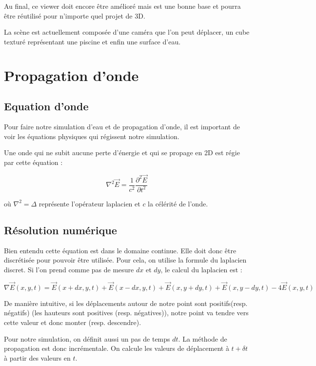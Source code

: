 \documentclass[a4paper,11pt,leqno]{article}
\begin{document}
Au final, ce viewer doit encore être amélioré mais est une bonne base et pourra être réutilisé pour n'importe quel projet de 3D.

La scène est actuellement composée d'une caméra que l'on peut déplacer, un cube texturé représentant une piscine et enfin une surface d'eau.

\section{Propagation d'onde}
\subsection{Equation d'onde}

Pour faire notre simulation d'eau et de propagation d'onde, il est important de voir les équations physiques qui régissent notre simulation.

Une onde qui ne subit aucune perte d'énergie et qui se propage en 2D est régie par cette équation :

\[
    \nabla^2 \overrightarrow{E} = \frac{1}{c^2} \frac{\partial^2 \overrightarrow{E}}{\partial t^2}
\]

où $\nabla^2 = \Delta $ représente l'opérateur laplacien et $c$ la célérité de l'onde.

\subsection{Résolution numérique}

Bien entendu cette équation est dans le domaine continue. Elle doit donc être discrétisée pour pouvoir être utilisée. Pour cela, on utilise la formule du laplacien discret. Si l'on prend comme pas de mesure $dx$ et $dy$, le calcul du laplacien est :

\[
	\nabla \overrightarrow{E}(x,y,t) = \overrightarrow{E}(x + dx, y, t) +
									 \overrightarrow{E}(x - dx, y, t) +
									 \overrightarrow{E}(x, y + dy, t) +
									 \overrightarrow{E}(x, y - dy, t) -
									 4\overrightarrow{E}(x, y, t)
\]

De manière intuitive, si les déplacements autour de notre point sont positifs(resp. négatifs) (les hauteurs sont positives (resp. négatives)), notre point va tendre vers cette valeur et donc monter (resp. descendre).

Pour notre simulation, on définit aussi un pas de temps $dt$. La méthode de propagation est donc incrémentale. On calcule les valeurs de déplacement à $t + \delta t$ à partir des valeurs en $t$.
\end{document}
